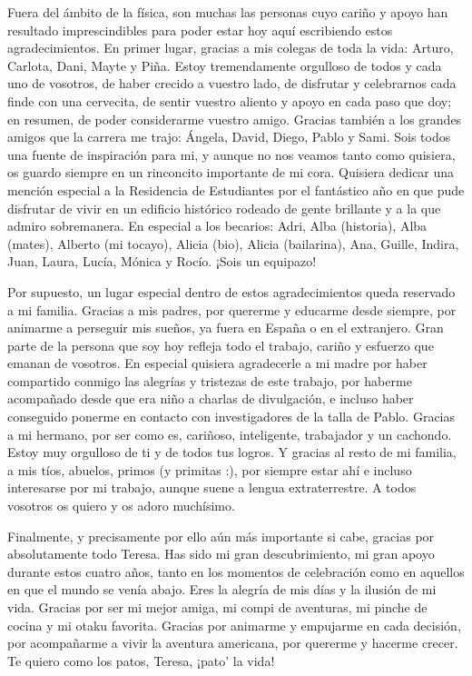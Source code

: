 Fuera del ámbito de la física, son muchas las personas cuyo cariño y apoyo han resultado imprescindibles para poder estar hoy aquí escribiendo estos agradecimientos. En primer lugar, gracias a mis colegas de toda la vida: Arturo, Carlota, Dani, Mayte y Piña. Estoy tremendamente orgulloso de todos y cada uno de vosotros, de haber crecido a vuestro lado, de disfrutar y celebrarnos cada finde con una cervecita, de sentir vuestro aliento y apoyo en cada paso que doy; en resumen, de poder considerarme vuestro amigo. Gracias también a los grandes amigos que la carrera me trajo: Ángela, David, Diego, Pablo y Sami. Sois todos una fuente de inspiración para mi, y aunque no nos veamos tanto como quisiera, os guardo siempre en un rinconcito importante de mi cora. Quisiera dedicar una mención especial a la Residencia de Estudiantes por el fantástico año en que pude disfrutar de vivir en un edificio histórico rodeado de gente brillante y a la que admiro sobremanera. En especial a los becarios: Adri, Alba (historia), Alba (mates), Alberto (mi tocayo), Alicia (bio), Alicia (bailarina), Ana, Guille, Indira, Juan, Laura, Lucía, Mónica y Rocío. ¡Sois un equipazo!

Por supuesto, un lugar especial dentro de estos agradecimientos queda reservado a mi familia. Gracias a mis padres, por quererme y educarme desde siempre, por animarme a perseguir mis sueños, ya fuera en España o en el extranjero. Gran parte de la persona que soy hoy refleja todo el trabajo, cariño y esfuerzo que emanan de vosotros. En especial quisiera agradecerle a mi madre por haber compartido conmigo las alegrías y tristezas de este trabajo, por haberme acompañado desde que era niño a charlas de divulgación, e incluso haber conseguido ponerme en contacto con investigadores de la talla de Pablo. Gracias a mi hermano, por ser como es, cariñoso, inteligente, trabajador y un cachondo. Estoy muy orgulloso de ti y de todos tus logros. Y gracias al resto de mi familia, a mis tíos, abuelos, primos (y primitas :), por siempre estar ahí e incluso interesarse por mi trabajo, aunque suene a lengua extraterrestre. A todos vosotros os quiero y os adoro muchísimo.

Finalmente, y precisamente por ello aún más importante si cabe, gracias por absolutamente todo Teresa. Has sido mi gran descubrimiento, mi gran apoyo durante estos cuatro años, tanto en los momentos de celebración como en aquellos en que el mundo se venía abajo. Eres la alegría de mis días y la ilusión de mi vida. Gracias por ser mi mejor amiga, mi compi de aventuras, mi pinche de cocina y mi otaku favorita. Gracias por animarme y empujarme en cada decisión, por acompañarme a vivir la aventura americana, por quererme y hacerme crecer. Te quiero como los patos, Teresa, ¡pato' la vida!




  
  